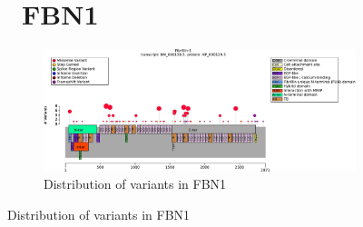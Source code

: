 \begin{figure}[htbp]
\section*{ FBN1}
\centering
\begin{subfigure}[b]{0.65\textwidth}
\centering
\includegraphics[width=\textwidth]{ img/FBN1_protein_diagram.pdf} 
\captionsetup{justification=raggedright,singlelinecheck=false}
\caption{Distribution of variants in FBN1}
\end{subfigure}



\end{figure}
